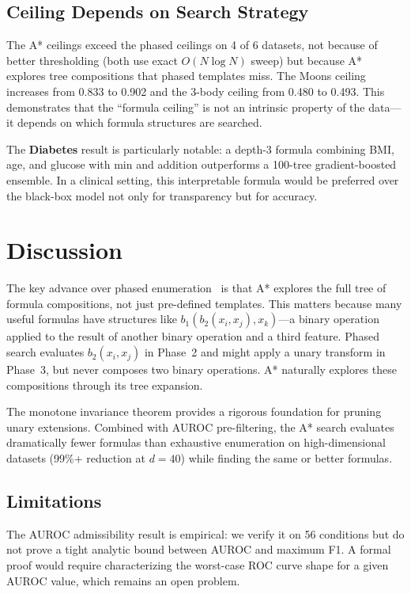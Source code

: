 \documentclass[journal]{IEEEtran}
\begin{document}
\subsection{Ceiling Depends on Search Strategy}

The A* ceilings exceed the phased ceilings on 4 of 6 datasets,
not because of better thresholding (both use exact $O(N\log N)$
sweep) but because A* explores tree compositions that phased
templates miss. The Moons ceiling increases from 0.833 to 0.902
and the 3-body ceiling from 0.480 to 0.493. This demonstrates
that the ``formula ceiling'' is not an intrinsic property of the
data---it depends on which formula structures are searched.

The \textbf{Diabetes} result is particularly notable: a depth-3
formula combining BMI, age, and glucose with min and addition
outperforms a 100-tree gradient-boosted ensemble. In a clinical
setting, this interpretable formula would be preferred over the
black-box model not only for transparency but for accuracy.

\section{Discussion}

The key advance over phased enumeration~\cite{bond2026phased} is
that A* explores the full tree of formula compositions, not just
pre-defined templates. This matters because many useful formulas
have structures like $b_1(b_2(x_i, x_j), x_k)$---a binary operation
applied to the result of another binary operation and a third feature.
Phased search evaluates $b_2(x_i, x_j)$ in Phase~2 and might apply
a unary transform in Phase~3, but never composes two binary operations.
A* naturally explores these compositions through its tree expansion.

The monotone invariance theorem provides a rigorous foundation for
pruning unary extensions. Combined with AUROC pre-filtering, the
A* search evaluates dramatically fewer formulas than exhaustive
enumeration on high-dimensional datasets (99\%+ reduction at $d=40$)
while finding the same or better formulas.

\subsection{Limitations}

The AUROC admissibility result is empirical: we verify it on 56
conditions but do not prove a tight analytic bound between AUROC
and maximum F1. A formal proof would require characterizing the
worst-case ROC curve shape for a given AUROC value, which remains
an open problem.
\end{document}
